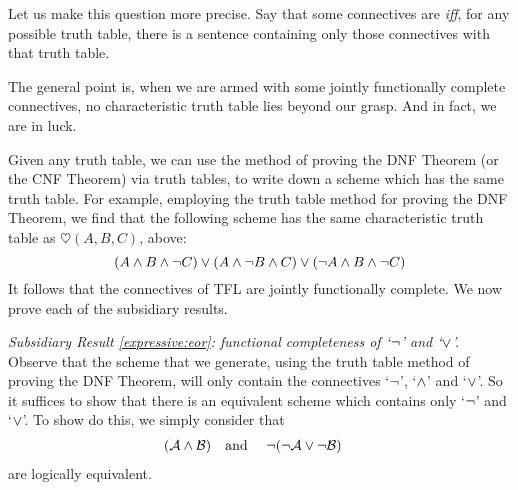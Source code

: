 Let us make this question more precise. Say that some connectives are  \emph{iff}, for any possible truth table, there is a sentence containing only those connectives with that truth table.


The general point is, when we are armed with some jointly functionally complete connectives, no characteristic truth table lies beyond our grasp. And in fact, we are in luck.

Given any truth table, we can use the method of proving the DNF Theorem (or the CNF Theorem) via truth tables, to write down a scheme which has the same truth table. For example, employing the truth table method for proving the DNF Theorem, we find that the following scheme has the same characteristic truth table as $\heartsuit(A,B,C)$, above:
		$$(A \wedge B \wedge \neg C) \vee (A \wedge \neg B \wedge C) \vee (\neg A \wedge B \wedge \neg C)$$			
It follows that the connectives of TFL are jointly functionally complete. We now prove each of the subsidiary results.
	
\emph{Subsidiary Result \ref{expressive:eor}: functional completeness of `$\neg$' and `$\vee$'.} Observe that the scheme that we generate, using the truth table method of proving the DNF Theorem, will only contain the connectives `$\neg$', `$\wedge$' and `$\vee$'. So it suffices to show that there is an equivalent scheme which contains only `$\neg$' and `$\vee$'. To show do this, we simply consider that
		\begin{align*}
		(\mathcal{A} \wedge \mathcal{B}) & \text{\quad and \quad} \neg(\neg \mathcal{A} \vee\neg \mathcal{B})
		\end{align*}
		are logically equivalent.

